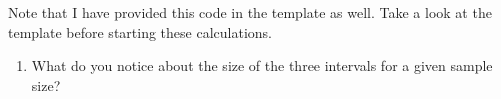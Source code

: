 \documentclass[letterpaper,9pt,twoside,printwatermark=false]{pinp}
\providecommand{\tightlist}{%
  \setlength{\itemsep}{0pt}\setlength{\parskip}{0pt}}
\begin{document}
Note that I have provided this code in the template as well. Take a look
at the template before starting these calculations.

\begin{enumerate}
\def\labelenumi{\alph{enumi}.}
\setcounter{enumi}{2}
\tightlist
\item
  What do you notice about the size of the three intervals for a given
  sample size?
\end{enumerate}





\end{document}

